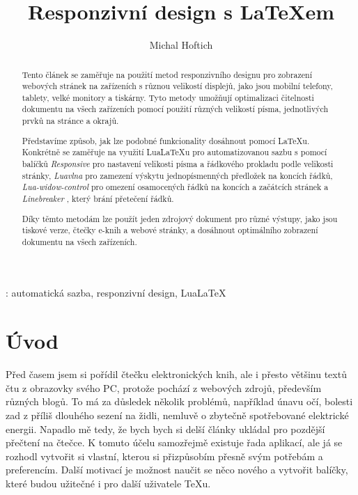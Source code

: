\documentclass{csbulletin}
\newcommand\balicek[1]{\textit{#1}}
\begin{document}
\title{Responzivní design s \LaTeX em}
\author{Michal Hoftich}
\maketitle

\begin{abstract}
Tento článek se zaměřuje na použití metod responzivního designu pro zobrazení
webových stránek na zařízeních s různou velikostí displejů, jako jsou mobilní
telefony, tablety, velké monitory a tiskárny. Tyto metody umožňují optimalizaci
čitelnosti dokumentu na všech zařízeních pomocí použití různých velikostí
písma, jednotlivých prvků na stránce a okrajů.

Představíme způsob, jak lze podobné funkcionality dosáhnout
pomocí \LaTeX u. Konkrétně se zaměřuje na využití Lua\LaTeX u pro automatizovanou
sazbu s pomocí balíčků \balicek{Responsive}\cite{responsive} pro nastavení velikosti písma a řádkového prokladu
podle velikosti stránky, \balicek{Luavlna} \cite{luavlna} pro zamezení výskytu jednopísmenných předložek
na koncích řádků, \balicek{Lua-widow-control}  \cite{lua-widow-control} pro omezení osamocených řádků na koncích a
začátcích stránek a \balicek{Linebreaker} \cite{linebreaker}, který brání přetečení řádků.

Díky těmto metodám lze použít jeden zdrojový dokument pro různé výstupy, jako
jsou tiskové verze, čtečky e-knih a webové stránky, a dosáhnout optimálního
zobrazení dokumentu na všech zařízeních.
\end{abstract}
\klicovaslova: automatická sazba, responzivní design, Lua\LaTeX


\section{Úvod}

Před časem jsem si pořídil čtečku elektronických knih, ale i přesto většinu
textů čtu z obrazovky svého PC, protože pochází z webových zdrojů, především 
různých blogů. To má za důsledek několik problémů, například únavu očí, bolesti zad
z příliš dlouhého sezení na židli, nemluvě o zbytečně spotřebované elektrické
energii. Napadlo mě tedy, že bych bych si delší články ukládal pro pozdější
přečtení na čtečce. K tomuto účelu samozřejmě existuje řada aplikací, ale 
já se rozhodl vytvořit si vlastní, kterou si přizpůsobím přesně svým potřebám
a preferencím. Další motivací je možnost naučit se něco nového a vytvořit
balíčky, které budou užitečné i pro další uživatele \TeX u. 
\end{document}
